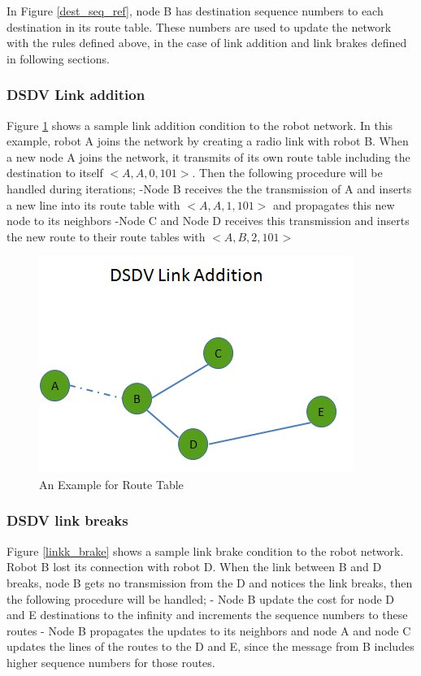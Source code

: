 In Figure \ref{dest_seq_ref}, node B has destination sequence numbers to each destination in its route table. These numbers are used to update the network with the rules defined above, in the case of link addition and link brakes defined in following sections.
\newpage	
\subsubsection{DSDV Link addition}

Figure \ref{linkk_addition} shows a sample link addition condition to the robot network. In this example, robot A joins the network by creating a radio link with robot B. When a new node A joins the network, it transmits of its own route table including the destination to itself $<A,A,0,101>$. Then the following procedure will be handled during iterations; \newline
	-Node B receives the the transmission of A and inserts a new line into its route table with $<A,A,1,101>$ and propagates this new node to its neighbors \newline
	-Node C and Node D receives this transmission and inserts the new route to their route tables with $<A,B,2,101>$

\begin{figure}[H]
\caption{An Example for Route Table} \label{linkk_addition}
\centering
\includegraphics[scale = 0.65]{link_add}
\end{figure}	
		
\subsubsection{DSDV link breaks}

Figure \ref{linkk_brake} shows a sample link brake condition to the robot network. Robot B lost its connection with robot D. When the link between B and D breaks, node B gets no transmission from the D and notices the link breaks, then the following procedure will be handled; \newline
	- Node B update the cost for node D and E destinations to the infinity and increments the sequence numbers to these routes \newline
	- Node B propagates the updates to its neighbors and node A and node C updates the lines of the routes to the D and E, since the message from B includes higher sequence numbers for those routes.
		
